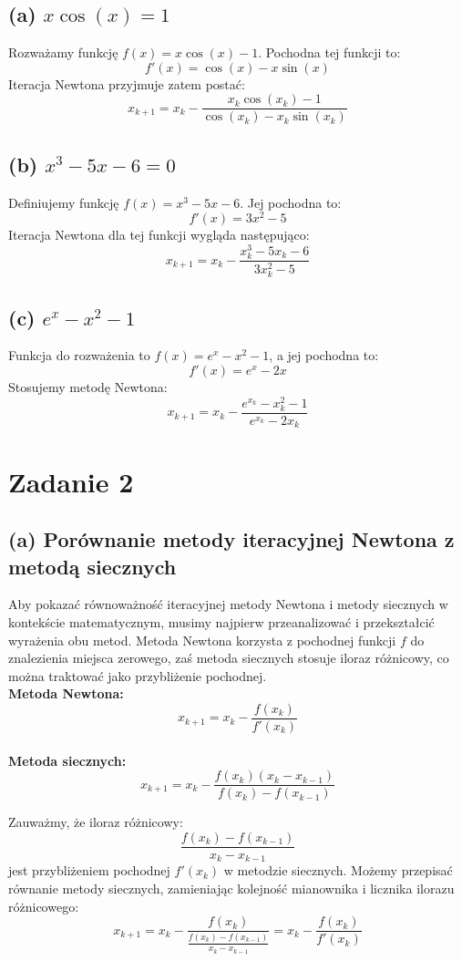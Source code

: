 \documentclass{article}
\begin{document}
\subsection*{(a) \( x \cos(x) = 1 \)}
Rozważamy funkcję \( f(x) = x \cos(x) - 1 \). Pochodna tej funkcji to:
\[ f'(x) = \cos(x) - x \sin(x) \]
Iteracja Newtona przyjmuje zatem postać:
\[ x_{k+1} = x_k - \frac{x_k \cos(x_k) - 1}{\cos(x_k) - x_k \sin(x_k)} \]

\subsection*{(b) \( x^3 - 5x - 6 = 0 \)}
Definiujemy funkcję \( f(x) = x^3 - 5x - 6 \). Jej pochodna to:
\[ f'(x) = 3x^2 - 5 \]
Iteracja Newtona dla tej funkcji wygląda następująco:
\[ x_{k+1} = x_k - \frac{x_k^3 - 5x_k - 6}{3x_k^2 - 5} \]

\subsection*{(c) \( e^x - x^2 - 1 \)}
Funkcja do rozważenia to \( f(x) = e^x - x^2 - 1 \), a jej pochodna to:
\[ f'(x) = e^x - 2x \]
Stosujemy metodę Newtona:
\[ x_{k+1} = x_k - \frac{e^{x_k} - x_k^2 - 1}{e^{x_k} - 2x_k} \]

\newpage
\section*{Zadanie 2}

\subsection*{(a) Porównanie metody iteracyjnej Newtona z metodą siecznych}

Aby pokazać równoważność iteracyjnej metody Newtona i metody siecznych w kontekście matematycznym, musimy najpierw przeanalizować i przekształcić wyrażenia obu metod. Metoda Newtona korzysta z pochodnej funkcji \( f \) do znalezienia miejsca zerowego, zaś metoda siecznych stosuje iloraz różnicowy, co można traktować jako przybliżenie pochodnej. \\

\textbf{Metoda Newtona:}
\[x_{k+1} = x_k - \frac{f(x_k)}{f'(x_k)}
\] \\

\textbf{Metoda siecznych:}
\[
x_{k+1} = x_k - \frac{f(x_k)(x_k - x_{k-1})}{f(x_k) - f(x_{k-1})}
\]

Zauważmy, że iloraz różnicowy:
\[
\frac{f(x_k) - f(x_{k-1})}{x_k - x_{k-1}}
\]
jest przybliżeniem pochodnej \( f'(x_k) \) w metodzie siecznych. Możemy przepisać równanie metody siecznych, zamieniając kolejność mianownika i licznika ilorazu różnicowego:\[x_{k+1} = x_k - \frac{f(x_k)}{\frac{f(x_k) - f(x_{k-1})}{x_k - x_{k-1}}}  = x_k - \frac{f(x_k)}{f'(x_k)}\]
\end{document}
